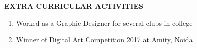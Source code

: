\documentclass[10pt]{article}
\begin{document}
\begin{minipage}{0.95\textwidth}
\vspace{5mm}
\begin{huge}
\textbf{\color{theme}EXTRA CURRICULAR ACTIVITIES}
\end{huge}
\begin{mdframed}[backgroundcolor=theme]
\end{mdframed}

\vspace{1mm}

\color{black}\normalsize{{
\begin{enumerate}
\item Worked as a Graphic Designer for several clubs in college\\
\item Winner of Digital Art Competition 2017 at Amity, Noida\\


\end{enumerate}
}}
\vspace{2mm}
\end{minipage}
\end{document}
